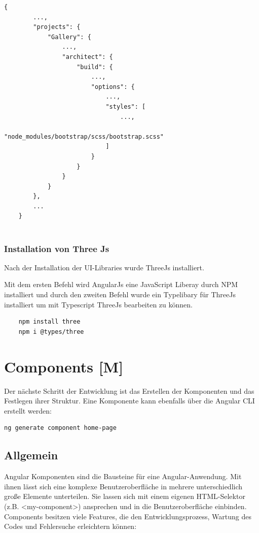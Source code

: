 \begin{lstlisting}[caption={{angular.json - Bootstrap Angular Verknüpfung}},label=lst:impl:BootstraptConfig]
    {
        ...,
        "projects": {
            "Gallery": {
                ...,
                "architect": {
                    "build": {
                        ...,
                        "options": {
                            ...,
                            "styles": [
                                ...,
                                "node_modules/bootstrap/scss/bootstrap.scss"
                            ]
                        }
                    }
                }
            }
        },
        ...
    }
    
\end{lstlisting}


\subsubsection{Installation von Three Js}
Nach der Installation der UI-Libraries wurde ThreeJs installiert. 

Mit dem ersten Befehl wird AngularJs eine JavaScript Liberay durch NPM installiert und durch den zweiten Befehl wurde ein Typelibary für ThreeJs installiert um mit Typescript ThreeJs bearbeiten zu können.
\begin{lstlisting}
    npm install three
    npm i @types/three
\end{lstlisting}

\section{Components [M]}
Der nächste Schritt der Entwicklung ist das Erstellen der Komponenten und das Festlegen ihrer Struktur. Eine Komponente kann ebenfalls über die Angular CLI erstellt werden:

\begin{lstlisting}[caption={{Terminal - Component erstellen}},language=bash,label=lst:impl:addComponent]
    ng generate component home-page
\end{lstlisting}

\subsection{Allgemein}
Angular Komponenten sind die Bausteine für eine Angular-Anwendung. Mit ihnen lässt sich eine komplexe Benutzeroberfläche in mehrere unterschiedlich große Elemente unterteilen. Sie lassen sich mit einem eigenen HTML-Selektor (z.B. <my-component>) ansprechen und in die Benutzeroberfläche einbinden. Components besitzen viele Features, die den Entwicklungsprozess, Wartung des Codes und Fehlersuche erleichtern können:

